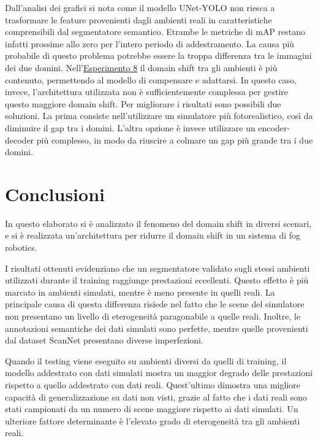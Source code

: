 \documentclass[12pt]{report}
\begin{document}
Dall'analisi dei grafici si nota come il modello UNet-YOLO non riesca a trasformare le feature provenienti dagli ambienti reali in caratteristiche comprensibili dal segmentatore semantico. Etrambe le metriche di mAP restano infatti prossime allo zero per l'intero periodo di addestramento. La causa più probabile di questo problema potrebbe essere la troppa differenza tra le immagini dei due domini. Nell'\hyperref[sec:esperimento_8]{Esperimento 8} il domain shift tra gli ambienti è più contenuto, permettendo al modello di compensare e adattarsi. In questo caso, invece, l'architettura utilizzata non è sufficientemente complessa per gestire questo maggiore domain shift. Per migliorare i risultati sono possibili due soluzioni. La prima consiste nell'utilizzare un simulatore più fotorealistico, così da diminuire il gap tra i domini. L'altra opzione è invece utilizzare un encoder-decoder più complesso, in modo da riuscire a colmare un gap più grande tra i due domini.

\chapter{Conclusioni}
\label{chap:conclusioni}

In questo elaborato si è analizzato il fenomeno del domain shift in diversi scenari, e si è realizzata un'architettura per ridurre il domain shift in un sistema di fog robotics.

I risultati ottenuti evidenziano che un segmentatore validato sugli stessi ambienti utilizzati durante il training raggiunge prestazioni  eccellenti. Questo effetto è più marcato in ambienti simulati, mentre è meno presente in quelli reali. La principale causa di questa differenza risiede nel fatto che le scene del simulatore non presentano un livello di eterogeneità paragonabile a quelle reali. Inoltre, le annotazioni semantiche dei dati simulati sono perfette, mentre quelle provenienti dal dataset ScanNet presentano diverse imperfezioni.

Quando il testing viene eseguito su ambienti diversi da quelli di training, il modello addestrato con dati simulati mostra un maggior degrado delle prestazioni rispetto a quello addestrato con dati reali. Quest'ultimo dimostra una migliore capacità di generalizzazione su dati non visti, grazie al fatto che i dati reali sono stati campionati da un numero di scene maggiore rispetto ai dati simulati. Un ulteriore fattore determinante è l'elevato grado di eterogeneità tra gli ambienti reali.
\end{document}
